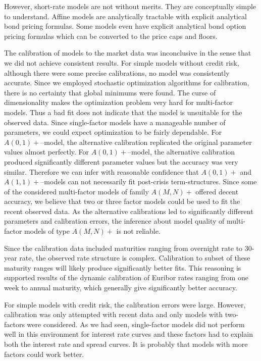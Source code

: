 However, short-rate models are not without merits. They are conceptually simple to understand. Affine models are analytically tractable with explicit analytical bond pricing formulas. Some models even have explicit analytical bond option pricing formulas which can be converted to the price caps and floors.

The calibration of models to the market data was inconclusive in the sense that we did not achieve consistent results. For simple models without credit risk, although there were some precise calibrations, no model was consistently accurate. Since we employed stochastic optimization algorithms for calibration, there is no certainty that global minimums were found. The curse of dimensionality makes the optimization problem very hard for multi-factor models. Thus a bad fit does not indicate that the model is unsuitable for the observed data. Since single-factor models have a manageable number of parameters, we could expect optimization to be fairly dependable. For $A(0,1)+$--model, the alternative calibration replicated the original parameter values almost perfectly. For $A(0,1)+$--model, the alternative calibration produced significantly different parameter values but the accuracy was very similar. Therefore we can infer with reasonable confidence that $A(0,1)+$ and $A(1,1)+$--models can not necessarily fit post-crisis term-structures. Since some of the considered multi-factor models of family $A(M,N)+$ offered decent accuracy, we believe that two or three factor models could be used to fit the recent observed data. As the alternative calibrations led to significantly different parameters and calibration errors, the inference about model quality of multi-factor models of type $A(M,N)+$ is not reliable.

Since the calibration data included maturities ranging from overnight rate to 30-year rate, the observed rate structure is complex. Calibration to subset of these maturity ranges will likely produce significantly better fits. This reasoning is supported results of the dynamic calibration of Euribor rates ranging from one week to annual maturity, which generally give significantly better accuracy. 

For simple models with credit risk, the calibration errors were large. However, calibration was only attempted with recent data and only models with two-factors were considered. As we had seen, single-factor models did not perform well in this environment for interest rate curves and these factors had to explain both the interest rate and spread curves. It is probably that models with more factors could work better.

